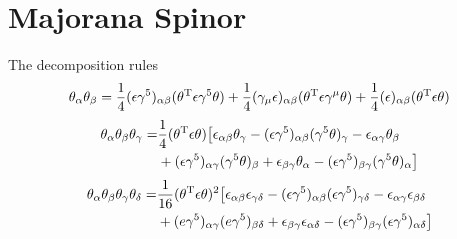 \section{Majorana Spinor}

The decomposition rules 
\begin{equation}
\tht_{\a}\tht_{\be} = 
\frac{1}{4} (\e\g^5)_{\a\be} (\tht^{\tra}\e\g^5\tht)+ 
\frac{1}{4}(\g_{\m}\e)_{\a\be}({\tht}^{\tra}\e\g^{\m}\tht)+
\frac{1}{4}(\e)_{\a\be}(\tht^{\tra}\e\tht)
\end{equation}
\begin{align}
\tht_\a\tht_\be\tht_\g 
= &\frac{1}{4}
(\tht^{\tra}\e \tht)
\big[
\e_{\a\be}\tht_{\g}
-(\e\g^5)_{\a\be}(\g^5\tht)_{\g}
-\e_{\a\g}\tht_\be\notag\\
&+(\e\g^5)_{\a\g}(\g^5\tht)_\be
+\e_{\be\g}\tht_\a
-(\e\g^5)_{\be\g}(\g^5\tht)_\a
\big]
\end{align}
\begin{align}
	\tht_\a\tht_\be\tht_\g\tht_\de
	=&\frac{1}{16}(\tht^{\tra}\e\tht)^2
	\big[
	\e_{\a\be}\e_{\g\de}
	-(\e\g^5)_{\a\be}(\e\g^5)_{\g\de}
	-\e_{\a\g}\e_{\be\de}\notag\\
	&+(e\g^5)_{\a\g}(e\g^5)_{\be\de}
	+\e_{\be\g}\e_{\a\de}
	-(\e\g^5)_{\be\g}(\e\g^5)_{\a\de}
	\big]
\end{align}